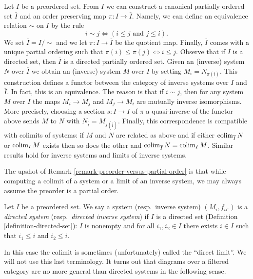 \begin{remark}
\label{remark-preorder-versus-partial-order}
Let $I$ be a preordered set. From $I$ we can construct a canonical
partially ordered set $\overline{I}$ and an order preserving map
$\pi : I \to \overline{I}$. Namely, we can define an equivalence
relation $\sim$ on $I$ by the rule
$$
i \sim j \Leftrightarrow (i \leq j\text{ and }j \leq i).
$$
We set $\overline{I} = I/\sim$ and we let $\pi : I \to \overline{I}$
be the quotient map. Finally, $\overline{I}$ comes with a unique
partial ordering such that
$\pi(i) \leq \pi(j) \Leftrightarrow i \leq j$.
Observe that if $I$ is a directed set, then $\overline{I}$
is a directed partially ordered set.
Given an (inverse) system $N$ over $\overline{I}$ we obtain an
(inverse) system $M$ over $I$ by setting $M_i = N_{\pi(i)}$.
This construction defines a functor between the category
of inverse systems over $I$ and $\overline{I}$.
In fact, this is an equivalence.
The reason is that if $i \sim j$, then for any system
$M$ over $I$ the maps $M_i \to M_j$ and $M_j \to M_i$ are
mutually inverse isomorphisms. More precisely, choosing
a section $s : \overline{I} \to I$ of $\pi$ a quasi-inverse
of the functor above sends $M$ to $N$ with
$N_{\overline{i}} = M_{s(\overline{i})}$.
Finally, this correspondence is compatible with colimits of systems:
if $M$ and $N$ are related as above and
if either $\mathop{\mathrm{colim}}\nolimits_{\overline{I}} N$ or $\mathop{\mathrm{colim}}\nolimits_I M$ exists
then so does the other and
$\mathop{\mathrm{colim}}\nolimits_{\overline{I}} N = \mathop{\mathrm{colim}}\nolimits_I M$.
Similar results hold for inverse systems and limits of inverse systems.
\end{remark}

\noindent
The upshot of Remark \ref{remark-preorder-versus-partial-order}
is that while computing a colimit of a system or a limit of
an inverse system, we may always assume the preorder is a partial order.

\begin{definition}
\label{definition-directed-system}
Let $I$ be a preordered set. We say a system (resp.\ inverse system)
$(M_i, f_{ii'})$ is a
{\it directed system} (resp.\ {\it directed inverse system})
if $I$ is a directed set
(Definition \ref{definition-directed-set}): $I$ is nonempty and
for all $i_1, i_2 \in I$ there exists $i\in I$ such that
$i_1 \leq i$ and $i_2 \leq i$.
\end{definition}

\noindent
In this case the colimit is sometimes (unfortunately)
called the ``direct limit''. We will not use this last
terminology. It turns out that diagrams over a filtered
category are no more general than directed systems in the
following sense.

